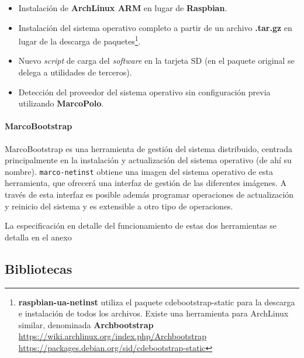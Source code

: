 \begin{itemize}
	\item Instalación de \textbf{ArchLinux ARM} en lugar de \textbf{Raspbian}.
	\item Instalación del sistema operativo completo a partir de un archivo \textbf{.tar.gz} en lugar de la descarga de paquetes\footnote{\textbf{raspbian-ua-netinst} utiliza el paquete cdebootstrap-static para la descarga e instalación de todos los archivos. Existe una herramienta para ArchLinux similar, denominada \textbf{Archbootstrap}\\
	\href{https://wiki.archlinux.org/index.php/Archbootstrap}{https://wiki.archlinux.org/index.php/Archbootstrap}\\
	\href{https://packages.debian.org/sid/cdebootstrap-static}{https://packages.debian.org/sid/cdebootstrap-static}}.
	\item Nuevo \textit{script} de carga del \textit{software} en la tarjeta SD (en el paquete original se delega a utilidades de terceros).
	\item Detección del proveedor del sistema operativo sin configuración previa utilizando \textbf{MarcoPolo}.
\end{itemize}


\paragraph{MarcoBootstrap\\}

MarcoBootstrap es una herramienta de gestión del sistema distribuido, centrada principalmente en la instalación y actualización del sistema operativo (de ahí su nombre). \texttt{marco-netinst} obtiene una imagen del sistema operativo de esta herramienta, que ofrecerá una interfaz de gestión de las diferentes imágenes. A través de esta interfaz es posible además programar operaciones de actualización y reinicio del sistema y es extensible a otro tipo de operaciones.

La especificación en detalle del funcionamiento de estas dos herramientas se detalla en el anexo\citationneeded[TODO]

\subsection{Bibliotecas}

